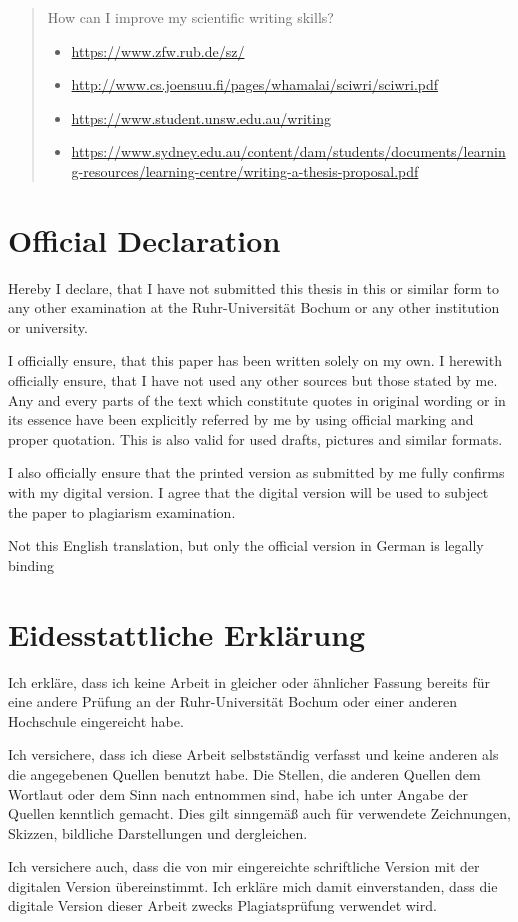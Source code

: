\begin{abstract}
How can I improve my scientific writing skills?
\begin{itemize}
 \item \url{https://www.zfw.rub.de/sz/}
 \item \url{http://www.cs.joensuu.fi/pages/whamalai/sciwri/sciwri.pdf}
 \item \url{https://www.student.unsw.edu.au/writing}
 \item \url{https://www.sydney.edu.au/content/dam/students/documents/learning-resources/learning-centre/writing-a-thesis-proposal.pdf}
\end{itemize}
\end{abstract}

\cleardoublepage

\pagestyle{scrplain} %
\section*{Official Declaration}
Hereby I declare, that I have not submitted this thesis in this or similar form to any other examination at the Ruhr-Universität Bochum or any other institution or university.

\noindent
I officially ensure, that this paper has been written solely on my own.
I herewith officially ensure, that I have not used any other sources but those stated by me.
Any and every parts of the text which constitute quotes in original wording or in its essence have been explicitly referred by me by using official marking and proper quotation.
This is also valid for used drafts, pictures and similar formats.

\noindent
I also officially ensure that the printed version as submitted by me fully confirms with my digital version.
I agree that the digital version will be used to subject the paper to plagiarism examination.

\noindent
Not this English translation, but only the official version in German is legally binding

\section*{Eidesstattliche Erklärung}
{
Ich erkläre, dass ich keine Arbeit in gleicher oder ähnlicher Fassung bereits für eine andere Prüfung an der Ruhr-Universität Bochum oder einer anderen Hochschule eingereicht habe.

\noindent
Ich versichere, dass ich diese Arbeit selbstständig verfasst und keine anderen als die angegebenen Quellen benutzt habe. Die Stellen, die anderen Quellen dem Wortlaut oder dem Sinn nach entnommen sind, habe ich unter Angabe der Quellen kenntlich gemacht.
Dies gilt sinngemäß auch für verwendete Zeichnungen, Skizzen, bildliche Darstellungen und dergleichen.

\noindent
Ich versichere auch, dass die von mir eingereichte schriftliche Version mit der digitalen Version übereinstimmt.
Ich erkläre mich damit einverstanden, dass die digitale Version dieser Arbeit zwecks Plagiatsprüfung verwendet wird.\@}

